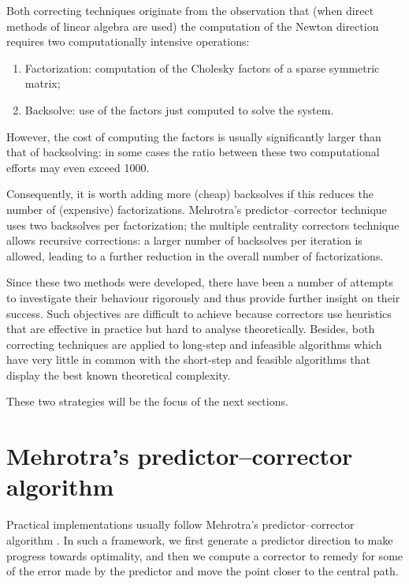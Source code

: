 
Both correcting techniques originate from the observation that 
(when direct methods of linear algebra are used) the computation 
of the Newton direction requires two computationally intensive
operations: 
\begin{enumerate}
\item Factorization: computation of the Cholesky factors of a sparse 
symmetric matrix; 
\item Backsolve: use of the factors just computed to solve the system. 
\end{enumerate}
However, the cost of computing the factors is usually significantly 
larger than that of backsolving: in some cases the ratio between 
these two computational efforts may even exceed 1000. 


Consequently, it is worth adding more (cheap) 
backsolves if this reduces the number of (expensive) factorizations. 
Mehrotra's predictor--corrector technique \cite{Mehrotra92} uses two 
backsolves per factorization; the multiple centrality correctors technique
\cite{Gondzio96} allows recursive corrections: a larger number 
of backsolves per iteration is allowed, leading to a further reduction 
in the overall number of factorizations. 

Since these two methods were developed, there have been a number of 
attempts to investigate their behaviour rigorously and thus provide
further insight on their success. 
Such objectives are difficult to achieve because 
correctors use heuristics that are effective in practice but hard 
to analyse theoretically. 
Besides, both correcting techniques are applied to long-step and infeasible 
algorithms which have very little in common with the short-step and 
feasible algorithms that display the best known theoretical complexity.

These two strategies will be the focus of the next sections.


%
%
\section{Mehrotra's predictor--corrector algorithm}
\label{sec:MehrotraPC}

Practical implementations usually follow Mehrotra's predictor--corrector 
algorithm \cite{Mehrotra92}. In such a framework, we first generate a 
predictor direction to make progress towards optimality, and then we 
compute a corrector to remedy for some of the error made by the predictor
and move the point closer to the central path.

